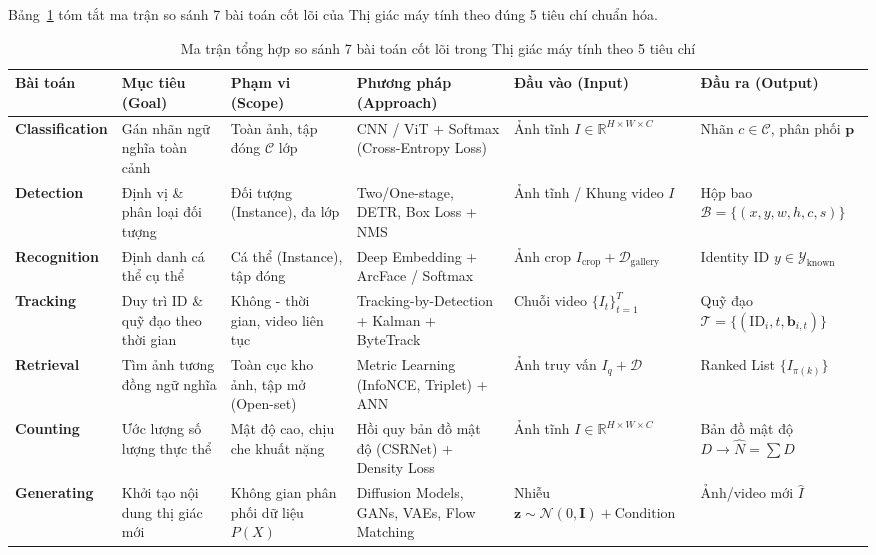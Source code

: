 Bảng~\ref{tab:master_cv_tasks} tóm tắt ma trận so sánh 7 bài toán cốt lõi của Thị giác máy tính theo đúng 5 tiêu chí chuẩn hóa.

\begin{table}[H]
\centering
\scriptsize
\setlength{\tabcolsep}{3.5pt}
\caption{Ma trận tổng hợp so sánh 7 bài toán cốt lõi trong Thị giác máy tính theo 5 tiêu chí}
\label{tab:master_cv_tasks}
\renewcommand{\arraystretch}{1.25}
\begin{tabularx}{\textwidth}{|>{\raggedright\arraybackslash\hsize=0.85\hsize}X|>{\raggedright\arraybackslash\hsize=0.95\hsize}X|>{\raggedright\arraybackslash\hsize=0.95\hsize}X|>{\raggedright\arraybackslash\hsize=1.25\hsize}X|>{\raggedright\arraybackslash\hsize=0.95\hsize}X|>{\raggedright\arraybackslash\hsize=1.05\hsize}X|}
\hline
\textbf{Bài toán} & \textbf{Mục tiêu (Goal)} & \textbf{Phạm vi (Scope)} & \textbf{Phương pháp (Approach)} & \textbf{Đầu vào (Input)} & \textbf{Đầu ra (Output)} \\
\hline
\textbf{Classification} & Gán nhãn ngữ nghĩa toàn cảnh & Toàn ảnh, tập đóng $\mathcal{C}$ lớp & CNN / ViT + Softmax (Cross-Entropy Loss) & Ảnh tĩnh $I \in \mathbb{R}^{H \times W \times C}$ & Nhãn $c \in \mathcal{C}$, phân phối $\mathbf{p}$ \\
\hline
\textbf{Detection} & Định vị \& phân loại đối tượng & Đối tượng (Instance), đa lớp & Two/One-stage, DETR, Box Loss + NMS & Ảnh tĩnh / Khung video $I$ & Hộp bao $\mathcal{B} = \{(x, y, w, h, c, s)\}$ \\
\hline
\textbf{Recognition} & Định danh cá thể cụ thể & Cá thể (Instance), tập đóng & Deep Embedding + ArcFace / Softmax & Ảnh crop $I_{\text{crop}} + \mathcal{D}_{\text{gallery}}$ & Identity ID $y \in \mathcal{Y}_{\text{known}}$ \\
\hline
\textbf{Tracking} & Duy trì ID \& quỹ đạo theo thời gian & Không - thời gian, video liên tục & Tracking-by-Detection + Kalman + ByteTrack & Chuỗi video $\{I_t\}_{t=1}^T$ & Quỹ đạo $\mathcal{T} = \{(\text{ID}_i, t, \mathbf{b}_{i,t})\}$ \\
\hline
\textbf{Retrieval} & Tìm ảnh tương đồng ngữ nghĩa & Toàn cục kho ảnh, tập mở (Open-set) & Metric Learning (InfoNCE, Triplet) + ANN & Ảnh truy vấn $I_q + \mathcal{D}$ & Ranked List $\{I_{\pi(k)}\}$ \\
\hline
\textbf{Counting} & Ước lượng số lượng thực thể & Mật độ cao, chịu che khuất nặng & Hồi quy bản đồ mật độ (CSRNet) + Density Loss & Ảnh tĩnh $I \in \mathbb{R}^{H \times W \times C}$ & Bản đồ mật độ $D \rightarrow \hat{N} = \sum D$ \\
\hline
\textbf{Generating} & Khởi tạo nội dung thị giác mới & Không gian phân phối dữ liệu $P(X)$ & Diffusion Models, GANs, VAEs, Flow Matching & Nhiễu $\mathbf{z} \sim \mathcal{N}(0,\mathbf{I}) + \text{Condition}$ & Ảnh/video mới $\hat{I}$ \\
\hline
\end{tabularx}
\end{table}

